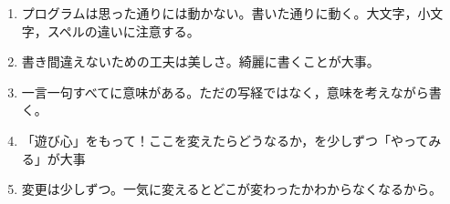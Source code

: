 \begin{enumerate}
	\item プログラムは思った通りには動かない。書いた通りに動く。大文字，小文字，スペルの違いに注意する。
	\item 書き間違えないための工夫は美しさ。綺麗に書くことが大事。
	\item 一言一句すべてに意味がある。ただの写経ではなく，意味を考えながら書く。
	\item 「遊び心」をもって！ここを変えたらどうなるか，を少しずつ「やってみる」が大事
	\item 変更は少しずつ。一気に変えるとどこが変わったかわからなくなるから。
\end{enumerate}
